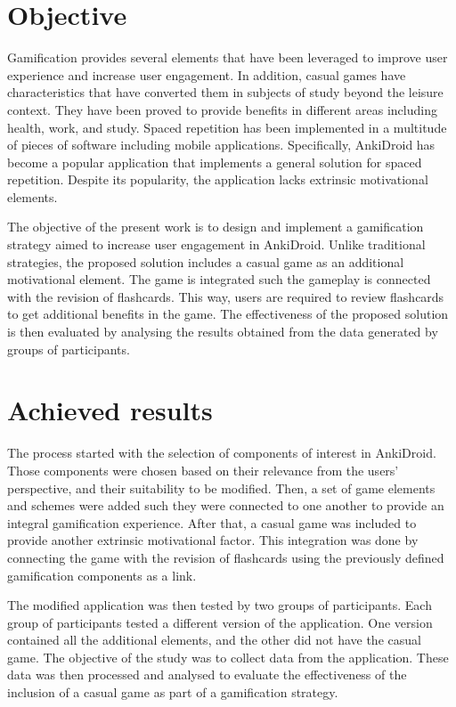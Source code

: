 \section{Objective}
Gamification provides several elements that have been leveraged to improve user experience and increase user engagement. In addition, casual games have characteristics that have converted them in subjects of study beyond the leisure context. They have been proved to provide benefits in different areas including health, work, and study. Spaced repetition has been implemented in a multitude of pieces of software including mobile applications. Specifically, AnkiDroid has become a popular application that implements a general solution for spaced repetition. Despite its popularity, the application lacks extrinsic motivational elements.

The objective of the present work is to design and implement a gamification strategy aimed to increase user engagement in AnkiDroid. Unlike traditional strategies, the proposed solution includes a casual game as an additional motivational element. The game is integrated such the gameplay is connected with the revision of flashcards. This way, users are required to review flashcards to get additional benefits in the game.
The effectiveness of the proposed solution is then evaluated by analysing the results obtained from the data generated by groups of participants.


\section{Achieved results}
The process started with the selection of components of interest in AnkiDroid. Those components were chosen based on their relevance from the users' perspective, and their suitability to be modified. Then, a set of game elements and schemes were added such they were connected to one another to provide an integral gamification experience. After that, a casual game was included to provide another extrinsic motivational factor. This integration was done by connecting the game with the revision of flashcards using the previously defined gamification components as a link.

The modified application was then tested by two groups of participants. Each group of participants tested a different version of the application. One version contained all the additional elements, and the other did not have the casual game. The objective of the study was to collect data from the application. These data was then processed and analysed to evaluate the effectiveness of the inclusion of a casual game as part of a gamification strategy.

